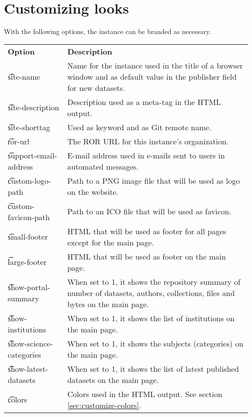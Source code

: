 \section{Customizing looks}

  With the following options, the instance can be branded as necessary.

\begin{tabularx}{\textwidth}{*{1}{!{\VRule[-1pt]}l}!{\VRule[-1pt]}X}
  \headrow
  \textbf{Option}             & \textbf{Description}\\
  \t{site-name}               & Name for the instance used in the title of a
                                browser window and as default value in the
                                publisher field for new datasets.\\
  \t{site-description}        & Description used as a meta-tag in the HTML
                                output.\\
  \t{site-shorttag}           & Used as keyword and as Git remote name.\\
  \t{ror-url}                 & The ROR URL for this instance's organization.\\
  \t{support-email-address}   & E-mail address used in e-mails sent to users
                                in automated messages.\\
  \t{custom-logo-path}        & Path to a PNG image file that will be used as
                                logo on the website.\\
  \t{custom-favicon-path}     & Path to an ICO file that will be used as
                                favicon.\\
  \t{small-footer}            & HTML that will be used as footer for all
                                pages except for the main page.\\
  \t{large-footer}            & HTML that will be used as footer on the
                                main page.\\
  \t{show-portal-summary}     & When set to 1, it shows the repository summary
                                of number of datasets, authors, collections,
                                files and bytes on the main page.\\
  \t{show-institutions}       & When set to 1, it shows the list of
                                institutions on the main page.\\
  \t{show-science-categories} & When set to 1, it shows the subjects
                                (categories) on the main page.\\
  \t{show-latest-datasets}    & When set to 1, it shows the list of latest
                                published datasets on the main page.\\
  \t{colors}                  & Colors used in the HTML output. See section
                                \ref{sec:customize-colors}.
\end{tabularx}

